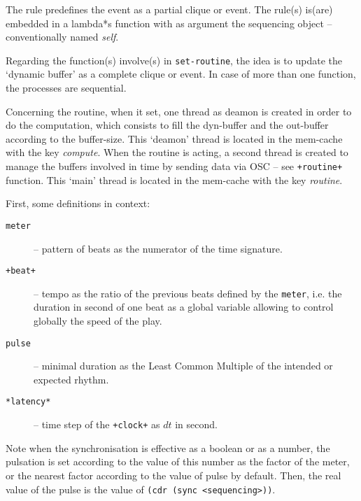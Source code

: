 \smallskip

The rule predefines the event as a partial clique or event. The rule(s) is(are) embedded in a \glspl{lambda*} function with as argument the sequencing object -- conventionally named \textit{self}.

\smallskip
 
Regarding the function(s) involve(s) in \texttt{set-routine}, the idea is to update the `dynamic buffer' as a complete clique or event. In case of more than one function, the processes are sequential. 

\smallskip

Concerning the routine, when it set, one thread as deamon is created in order to do the computation, which consists to fill the dyn-buffer and the out-buffer according to the buffer-size. This `deamon' thread is located in the mem-cache with the key \textsl{compute}. When the routine is acting, a second thread is created to manage the buffers involved in time by sending data via OSC -- see \texttt{+routine+} function. This `main' thread is located in the mem-cache with the key \textsl{routine}.

\newpage
{}

\bigskip

First, some definitions in context:
\begin{description}
\item[\texttt{meter}] -- pattern of beats as the numerator of the time signature.
\item[\texttt{+beat+}] -- tempo as the ratio of the previous beats defined by the \texttt{meter}, i.e. the duration in second of one beat as a global variable allowing to control globally the speed of the play.
\item[\texttt{pulse}] -- minimal duration as the Least Common Multiple of the intended or expected rhythm.
\item[\texttt{*latency*}] -- time step of the \texttt{+clock+} as $dt$ in second.
\end{description}
   
   \smallskip
   
Note when the synchronisation is effective as a boolean or as a number, the pulsation is set according to the value of this number as the factor of the meter, or the nearest factor according to the value of pulse by default. Then, the real value of the pulse is the value of \texttt{(cdr (sync <sequencing>))}.  

